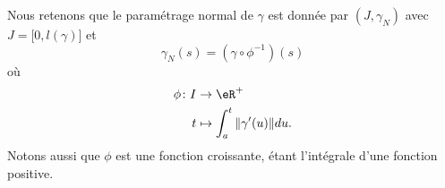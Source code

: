 Nous retenons que le paramétrage normal de \( \gamma\) est donnée par \( (J,\gamma_N)\) avec \( J=\mathopen[ 0 , l(\gamma) \mathclose]\) et
\begin{equation}        \label{EqFomVPcogammaN}
	\gamma_N(s)=(\gamma\circ\phi^{-1})(s)
\end{equation}
où
\begin{equation}        \label{EqFomVPcoordnorm}
	\begin{aligned}
		\phi\colon I & \to \eR^+                           \\
		t            & \mapsto \int_a^t\| \gamma'(u) \|du.
	\end{aligned}
\end{equation}
Notons aussi que \( \phi\) est une fonction croissante, étant l'intégrale d'une fonction positive.

